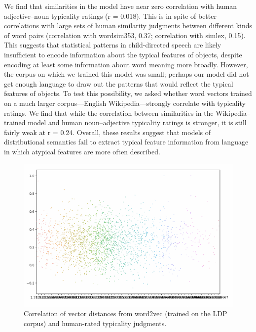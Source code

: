 \documentclass[10pt, letterpaper]{article}
\newenvironment{CodeChunk}{}{}
\begin{document}
We find that similarities in the model have near zero correlation with
human adjective--noun typicality ratings (r = 0.018). This is in spite
of better correlations with large sets of human similarity judgments
between different kinds of word pairs (correlation with wordsim353,
0.37; correlation with simlex, 0.15). This suggests that statistical
patterns in child-directed speech are likely insufficient to encode
information about the typical features of objects, despite encoding at
least some information about word meaning more broadly. However, the
corpus on which we trained this model was small; perhaps our model did
not get enough language to draw out the patterns that would reflect the
typical features of objects. To test this possibility, we asked whether
word vectors trained on a much larger corpus---English
Wikipedia---strongly correlate with typicality ratings. We find that
while the correlation between similarities in the Wikipedia--trained
model and human noun--adjective typicality ratings is stronger, it is
still fairly weak at r = 0.24. Overall, these results suggest that
models of distributional semantics fail to extract typical feature
information from language in which atypical features are more often
described.

\begin{CodeChunk}
\begin{figure}[tb]

{\centering \includegraphics{figs/word2vec-1} 

}

\caption[Correlation of vector distances from word2vec (trained on the LDP corpus) and human-rated typicality judgments]{Correlation of vector distances from word2vec (trained on the LDP corpus) and human-rated typicality judgments.}\label{fig:word2vec}
\end{figure}
\end{CodeChunk}
\end{document}
